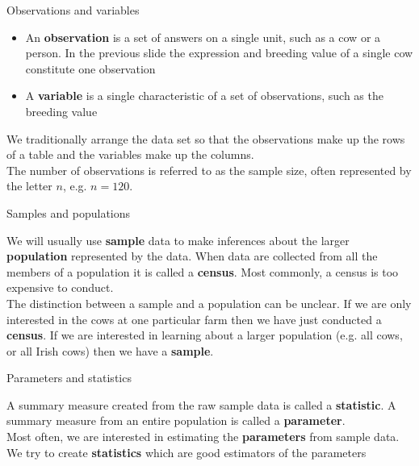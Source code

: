 \documentclass[12pt,xcolor=dvipsnames,handout,mathserif,aspectratio=169]{beamer}
\newcommand{\bbl}[1]{{\color{NavyBlue} \textbf{#1}}}
\newcommand{\bre}[1]{{\color{red} \textbf{#1}}}
\newcommand{\bgr}[1]{{\color{PineGreen} \textbf{#1}}}
\begin{document}
\begin{frame}{ Observations and variables }

\begin{itemize}
\item An \bgr{observation} is a set of answers on a single unit, such as a cow or a person. In the previous slide the expression and breeding value of a single cow constitute one observation
\pause
\item A \bgr{variable} is a single characteristic of a set of observations, such as the breeding value
\end{itemize}
\pause
We traditionally arrange the data set so that the observations make up the rows of a table and the variables make up the columns.\\
\vspace{0.5cm}
The number of observations is referred to as the sample size, often represented by the letter $n$, e.g. $n=120$.
\end{frame}

\begin{frame}{ Samples and populations }

We will usually use \bbl{sample} data to make inferences about the larger \bre{population} represented by the data. When data are collected from all the members of a population it is called a \bgr{census}. Most commonly, a census is too expensive to conduct.\\
\pause
\vspace{0.2cm}
The distinction between a sample and a population can be unclear. If we are only interested in the cows at one particular farm then we have just conducted a \bgr{census}. If we are interested in learning about a larger population (e.g. all cows, or all Irish cows) then we have a \bbl{sample}. \\
\end{frame}

\begin{frame}{ Parameters and statistics }

A summary measure created from the raw sample data is called a \bgr{statistic}. A summary measure from an entire population is called a \bbl{parameter}.\\
\pause
\vspace{0.2cm}
Most often, we are interested in estimating the \bbl{parameters} from sample data. We try to create \bgr{statistics} which are good estimators of the parameters
\end{frame}
\end{document}
